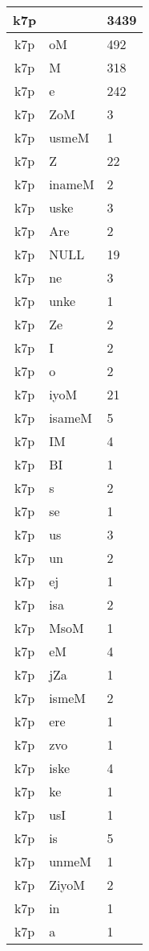 \documentclass[a4 paper]{article}
\begin{document}
\begin{longtable}{cp{}p{}}
k7p &  & 3439\\ \midrule k7p & oM & 492\\ \midrule k7p & M & 318\\ \midrule k7p & e & 242\\ \midrule k7p & ZoM & 3\\ \midrule k7p & usmeM & 1\\ \midrule k7p & Z & 22\\ \midrule k7p & inameM & 2\\ \midrule k7p & uske & 3\\ \midrule k7p & Are & 2\\ \midrule k7p & NULL & 19\\ \midrule k7p & ne & 3\\ \midrule k7p & unke & 1\\ \midrule k7p & Ze & 2\\ \midrule k7p & I & 2\\ \midrule k7p & o & 2\\ \midrule k7p & iyoM & 21\\ \midrule k7p & isameM & 5\\ \midrule k7p & IM & 4\\ \midrule k7p & BI & 1\\ \midrule k7p & s & 2\\ \midrule k7p & se & 1\\ \midrule k7p & us & 3\\ \midrule k7p & un & 2\\ \midrule k7p & ej & 1\\ \midrule k7p & isa & 2\\ \midrule k7p & MsoM & 1\\ \midrule k7p & eM & 4\\ \midrule k7p & jZa & 1\\ \midrule k7p & ismeM & 2\\ \midrule k7p & ere & 1\\ \midrule k7p & zvo & 1\\ \midrule k7p & iske & 4\\ \midrule k7p & ke & 1\\ \midrule k7p & usI & 1\\ \midrule k7p & is & 5\\ \midrule k7p & unmeM & 1\\ \midrule k7p & ZiyoM & 2\\ \midrule k7p & in & 1\\ \midrule k7p & a & 1\\ \midrule 

\end{longtable}
\end{document}
